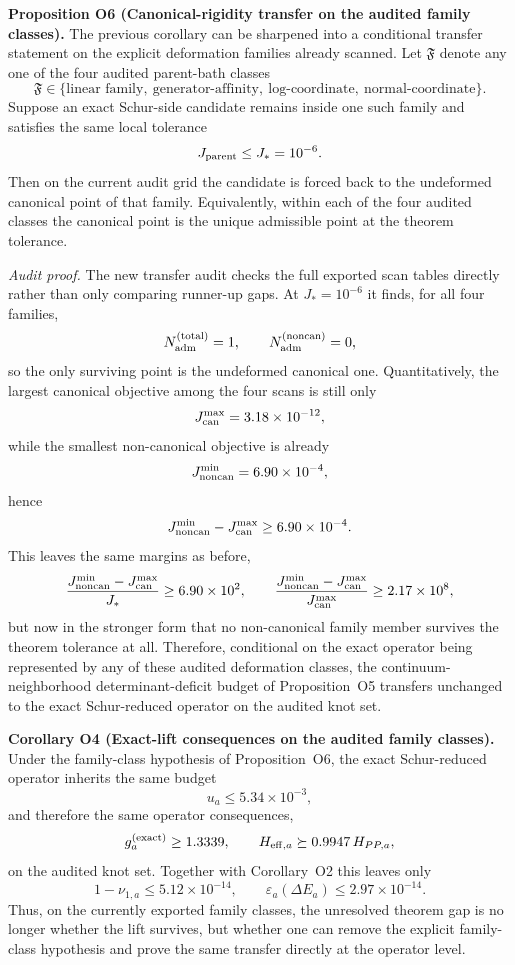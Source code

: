 \documentclass[aps,prd,onecolumn,notitlepage,nofootinbib,superscriptaddress,11pt,floatfix]{revtex4-2}
\begin{document}
\medskip\noindent\textbf{Proposition O6 (Canonical-rigidity transfer on the audited family classes).}
The previous corollary can be sharpened into a conditional transfer statement on the explicit deformation families already scanned. Let $\mathfrak F$ denote any one of the four audited parent-bath classes
\[
\mathfrak F\in\{\text{linear family},\ \text{generator-affinity},\ \text{log-coordinate},\ \text{normal-coordinate}\}.
\]
Suppose an exact Schur-side candidate remains inside one such family and satisfies the same local tolerance
\[
J_{\rm parent}\le J_\ast=10^{-6}.
\]
Then on the current audit grid the candidate is forced back to the undeformed canonical point of that family. Equivalently, within each of the four audited classes the canonical point is the unique admissible point at the theorem tolerance.

\textit{Audit proof.} The new transfer audit  checks the full exported scan tables directly rather than only comparing runner-up gaps. At $J_\ast=10^{-6}$ it finds, for all four families,
\[
N_{\rm adm}^{\rm(total)}=1,
\qquad
N_{\rm adm}^{\rm(noncan)}=0,
\]
so the only surviving point is the undeformed canonical one. Quantitatively, the largest canonical objective among the four scans is still only
\[
J_{\rm can}^{\max}=3.18\times10^{-12},
\]
while the smallest non-canonical objective is already
\[
J_{\rm noncan}^{\min}=6.90\times10^{-4},
\]
hence
\[
J_{\rm noncan}^{\min}-J_{\rm can}^{\max}\ge 6.90\times10^{-4}.
\]
This leaves the same margins as before,
\[
\frac{J_{\rm noncan}^{\min}-J_{\rm can}^{\max}}{J_\ast}\ge 6.90\times10^{2},
\qquad
\frac{J_{\rm noncan}^{\min}-J_{\rm can}^{\max}}{J_{\rm can}^{\max}}\ge 2.17\times10^{8},
\]
but now in the stronger form that no non-canonical family member survives the theorem tolerance at all. Therefore, conditional on the exact operator being represented by any of these audited deformation classes, the continuum-neighborhood determinant-deficit budget of Proposition~O5 transfers unchanged to the exact Schur-reduced operator on the audited knot set.

\medskip\noindent\textbf{Corollary O4 (Exact-lift consequences on the audited family classes).}
Under the family-class hypothesis of Proposition~O6, the exact Schur-reduced operator inherits the same budget
\[
u_a\le 5.34\times10^{-3},
\]
and therefore the same operator consequences,
\[
g_a^{\rm(exact)}\ge 1.3339,
\qquad
H_{{\rm eff},a}\succeq 0.9947\,H_{PP,a},
\]
on the audited knot set. Together with Corollary~O2 this leaves only
\[
1-\nu_{1,a}\le 5.12\times10^{-14},
\qquad
\varepsilon_a(\Delta E_a)\le 2.97\times10^{-14}.
\]
Thus, on the currently exported family classes, the unresolved theorem gap is no longer whether the lift survives, but whether one can remove the explicit family-class hypothesis and prove the same transfer directly at the operator level.
\end{document}

